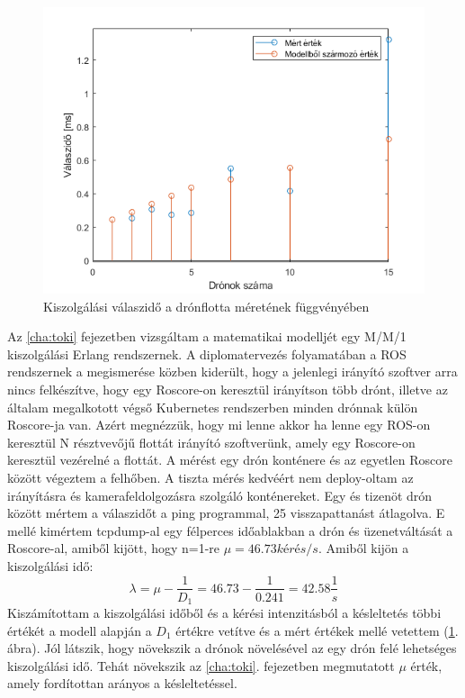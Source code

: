 \begin{figure}
	\centering
	\includegraphics{figures/meres_iperf_model.png}
	\caption{Kiszolgálási válaszidő a drónflotta méretének függvényében}
	\label{fig:meresros}
\end{figure}

\noindent
Az \ref{cha:toki} fejezetben vizsgáltam a matematikai modelljét egy M/M/1 kiszolgálási Erlang rendszernek. A diplomatervezés folyamatában a ROS rendszernek a megismerése közben kiderült, hogy a jelenlegi irányító szoftver arra nincs felkészítve, hogy egy Roscore-on keresztül irányítson több drónt, illetve az általam megalkotott végső Kubernetes rendszerben minden drónnak külön Roscore-ja van. Azért megnézzük, hogy mi lenne akkor ha lenne egy ROS-on keresztül N résztvevőjű flottát irányító szoftverünk, amely egy Roscore-on keresztül vezérelné a flottát. A mérést egy drón konténere és az egyetlen Roscore között végeztem a felhőben. A tiszta mérés kedvéért nem deploy-oltam az irányításra és kamerafeldolgozásra szolgáló konténereket. Egy és tizenöt drón között mértem a válaszidőt a ping programmal, 25 visszapattanást átlagolva.  E mellé kimértem tcpdump-al egy félperces időablakban a drón és üzenetváltását a Roscore-al, amiből kijött, hogy n=1-re $\mu = 46.73 kérés/s$. Amiből kijön a kiszolgálási idő: \[\lambda= \mu-\frac{1}{D_1} = 46.73-\frac{1}{0.241} = 42.58 \frac{1}{s} \] Kiszámítottam a kiszolgálási időből és a kérési intenzitásból a késleltetés többi értékét a modell alapján a $D_1$ értékre vetítve és a mért értékek mellé vetettem (\ref{fig:meresros}. ábra). Jól látszik, hogy növekszik a drónok növelésével az egy drón felé lehetséges kiszolgálási idő. Tehát növekszik az \ref{cha:toki}. fejezetben megmutatott $\mu$ érték, amely fordítottan arányos a késleltetéssel.


